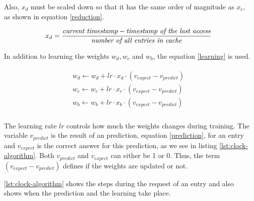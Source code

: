 \documentclass[
	12pt,
	a4paper,
	abstract,
	bibliography=totoc,
	chapterprefix,
	headings=openright,
	numbers=endperiod,
	parskip=half,
	twoside,
]{scrreprt}
\begin{document}
Also, $x_d$ must be scaled down so that it has the same order of magnitude as $x_c$, as shown in equation \ref{reduction}.

\begin{align}
	x_d = \frac{\emph{current timestamp} - \emph{timestamp of the last access}}{\emph{number of all entries in cache}} \label{reduction}
\end{align}
	
In addition to learning the weights $w_d, w_c$ and $w_b$, the equation \ref{learning} is used.

\begin{align}
\begin{split}
	w_d \leftarrow w_d + lr \cdot x_d \cdot (v_{expect} - v_{predict})\\
	w_c \leftarrow w_c + lr \cdot x_c \cdot (v_{expect} - v_{predict})\\
	w_b \leftarrow w_b + lr \cdot x_b \cdot (v_{expect} - v_{predict})\\
\end{split} \label{learning}
\end{align}

The learning rate $lr$ controls how much the weights changes during training.
The variable $v_{predict}$ is the result of an prediction, equation \ref{prediction}, for an entry and 
$v_{expect}$ is the correct answer for this prediction, as we see in listing \ref{lst:clock-algorithm}.
Both $v_{predict}$ and $v_{expect}$ can either be 1 or 0.
Thus, the term $(v_{expect} - v_{predict})$ defines if the weights are updated or not.


\cref{lst:clock-algorithm} shows the steps during the request of an entry and also shows when 
the prediction and the learning take place.

\bigskip
\end{document}
